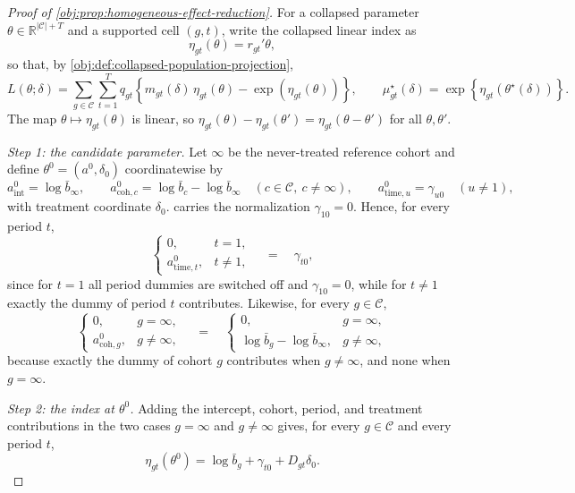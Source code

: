 \documentclass[11pt]{article}
\begin{document}
\begin{proof}[Proof of \cref{obj:prop:homogeneous-effect-reduction}]
For a collapsed parameter \(\theta\in\mathbb R^{|\mathcal C|+T}\) and a supported cell \((g,t)\), write the collapsed linear index as
\[
\eta_{gt}(\theta)=r_{gt}'\theta,
\]
so that, by \cref{obj:def:collapsed-population-projection},
\[
L(\theta;\delta)
=
\sum_{g\in\mathcal C}\sum_{t=1}^T
q_{gt}\left\{m_{gt}(\delta)\,\eta_{gt}(\theta)-\exp\!\left(\eta_{gt}(\theta)\right)\right\},
\qquad
\mu^\star_{gt}(\delta)=\exp\!\left\{\eta_{gt}(\theta^\star(\delta))\right\}.
\]
The map \(\theta\mapsto\eta_{gt}(\theta)\) is linear, so \(\eta_{gt}(\theta)-\eta_{gt}(\theta')=\eta_{gt}(\theta-\theta')\) for all \(\theta,\theta'\).

\textit{Step 1: the candidate parameter.} Let \(\infty\) be the never-treated reference cohort and define \(\theta^0=(a^0,\delta_0)\) coordinatewise by
\[
a^0_{\text{int}}=\log\bar b_\infty,
\qquad
a^0_{\text{coh},c}=\log\bar b_c-\log\bar b_\infty\quad(c\in\mathcal C,\ c\neq\infty),
\qquad
a^0_{\text{time},u}=\gamma_{u0}\quad(u\neq1),
\]
with treatment coordinate \(\delta_0\).
 carries the normalization \(\gamma_{10}=0\). Hence, for every period \(t\),
\[
\begin{cases}
0, & t=1,\\
a^0_{\text{time},t}, & t\neq1,
\end{cases}
\quad=\quad\gamma_{t0},
\]
since for \(t=1\) all period dummies are switched off and \(\gamma_{10}=0\), while for \(t\neq1\) exactly the dummy of period \(t\) contributes. Likewise, for every \(g\in\mathcal C\),
\[
\begin{cases}
0, & g=\infty,\\
a^0_{\text{coh},g}, & g\neq\infty,
\end{cases}
\quad=\quad
\begin{cases}
0, & g=\infty,\\
\log\bar b_g-\log\bar b_\infty, & g\neq\infty,
\end{cases}
\]
because exactly the dummy of cohort \(g\) contributes when \(g\neq\infty\), and none when \(g=\infty\).

\textit{Step 2: the index at \(\theta^0\).} Adding the intercept, cohort, period, and treatment contributions in the two cases \(g=\infty\) and \(g\neq\infty\) gives, for every \(g\in\mathcal C\) and every period \(t\),
\[
\eta_{gt}(\theta^0)=\log\bar b_g+\gamma_{t0}+D_{gt}\delta_0 .
\]


\end{proof}
\end{document}
